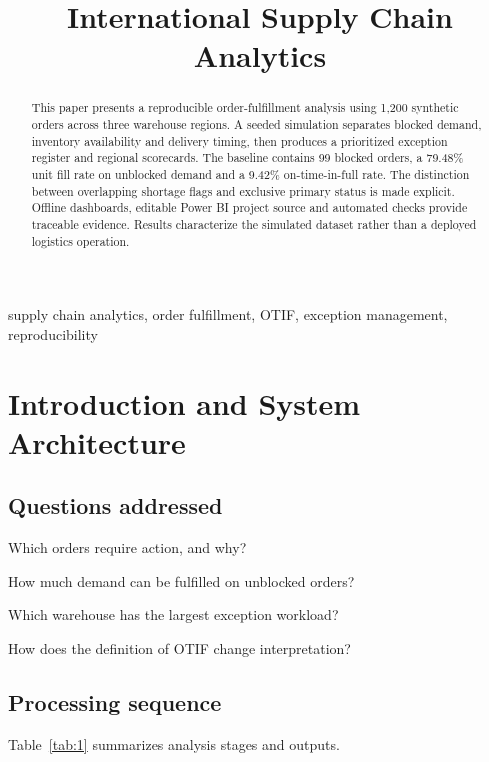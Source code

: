 \documentclass[conference,letterpaper]{IEEEtran}
\begin{document}
\title{International Supply Chain Analytics}
\author{}
\maketitle
\thispagestyle{plain}\pagestyle{plain}
\begin{abstract}This paper presents a reproducible order-fulfillment analysis using 1,200 synthetic orders across three warehouse regions. A seeded simulation separates blocked demand, inventory availability and delivery timing, then produces a prioritized exception register and regional scorecards. The baseline contains 99 blocked orders, a 79.48\% unit fill rate on unblocked demand and a 9.42\% on-time-in-full rate. The distinction between overlapping shortage flags and exclusive primary status is made explicit. Offline dashboards, editable Power BI project source and automated checks provide traceable evidence. Results characterize the simulated dataset rather than a deployed logistics operation.\end{abstract}

\begin{IEEEkeywords}supply chain analytics, order fulfillment, OTIF, exception management, reproducibility\end{IEEEkeywords}

\section{Introduction and System Architecture}

\subsection{Questions addressed}

\textbullet{} Which orders require action, and why?


\textbullet{} How much demand can be fulfilled on unblocked orders?


\textbullet{} Which warehouse has the largest exception workload?


\textbullet{} How does the definition of OTIF change interpretation?


\subsection{Processing sequence}

Table~\ref{tab:1} summarizes analysis stages and outputs.
\end{document}
